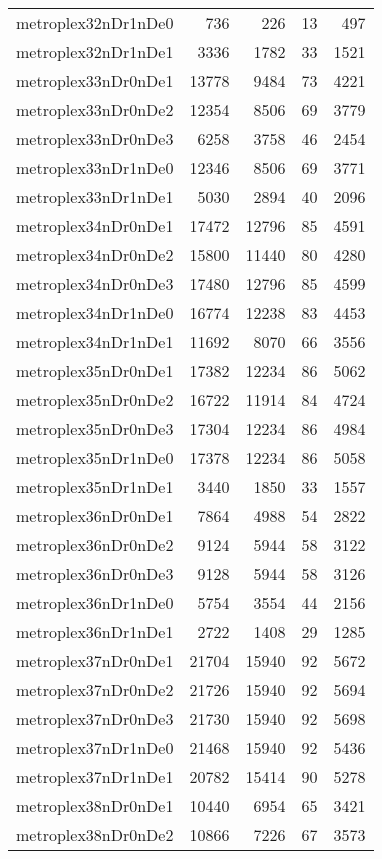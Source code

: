 \begin{tabular}{lrrrr}
metroplex32nDr1nDe0 & 736 & 226 & 13 & 497 \\
metroplex32nDr1nDe1 & 3336 & 1782 & 33 & 1521 \\
metroplex33nDr0nDe1 & 13778 & 9484 & 73 & 4221 \\
metroplex33nDr0nDe2 & 12354 & 8506 & 69 & 3779 \\
metroplex33nDr0nDe3 & 6258 & 3758 & 46 & 2454 \\
metroplex33nDr1nDe0 & 12346 & 8506 & 69 & 3771 \\
metroplex33nDr1nDe1 & 5030 & 2894 & 40 & 2096 \\
metroplex34nDr0nDe1 & 17472 & 12796 & 85 & 4591 \\
metroplex34nDr0nDe2 & 15800 & 11440 & 80 & 4280 \\
metroplex34nDr0nDe3 & 17480 & 12796 & 85 & 4599 \\
metroplex34nDr1nDe0 & 16774 & 12238 & 83 & 4453 \\
metroplex34nDr1nDe1 & 11692 & 8070 & 66 & 3556 \\
metroplex35nDr0nDe1 & 17382 & 12234 & 86 & 5062 \\
metroplex35nDr0nDe2 & 16722 & 11914 & 84 & 4724 \\
metroplex35nDr0nDe3 & 17304 & 12234 & 86 & 4984 \\
metroplex35nDr1nDe0 & 17378 & 12234 & 86 & 5058 \\
metroplex35nDr1nDe1 & 3440 & 1850 & 33 & 1557 \\
metroplex36nDr0nDe1 & 7864 & 4988 & 54 & 2822 \\
metroplex36nDr0nDe2 & 9124 & 5944 & 58 & 3122 \\
metroplex36nDr0nDe3 & 9128 & 5944 & 58 & 3126 \\
metroplex36nDr1nDe0 & 5754 & 3554 & 44 & 2156 \\
metroplex36nDr1nDe1 & 2722 & 1408 & 29 & 1285 \\
metroplex37nDr0nDe1 & 21704 & 15940 & 92 & 5672 \\
metroplex37nDr0nDe2 & 21726 & 15940 & 92 & 5694 \\
metroplex37nDr0nDe3 & 21730 & 15940 & 92 & 5698 \\
metroplex37nDr1nDe0 & 21468 & 15940 & 92 & 5436 \\
metroplex37nDr1nDe1 & 20782 & 15414 & 90 & 5278 \\
metroplex38nDr0nDe1 & 10440 & 6954 & 65 & 3421 \\
metroplex38nDr0nDe2 & 10866 & 7226 & 67 & 3573 \\

\end{tabular}
